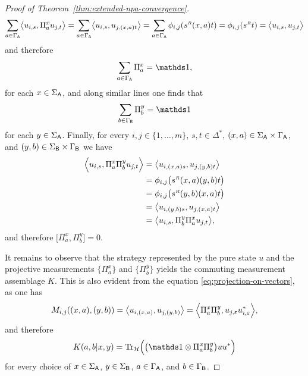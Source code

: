 \begin{proof}[Proof of Theorem~\ref{thm:extended-npa-convergence}]
  \begin{equation}
    \sum_{a\in \GammaA} \bigip{u_{i,s}}{\Pi^x_a u_{j,t}}
    = \sum_{a\in \GammaA} \bigip{u_{i,s}}{u_{j,(x,a)t}}
    = \sum_{a\in \GammaA} \phi_{i,j}(s^{\mathsmaller{R}}(x,a)t)
    = \phi_{i,j}(s^{\mathsmaller{R}}t) = \bigip{u_{i,s}}{u_{j,t}}
  \end{equation}
  and therefore
  \begin{equation}
    \sum_{a\in \GammaA}\Pi^x_a = \I, 
  \end{equation}
  for each $x\in \Sigma_{\mathsf{A}}$, and along similar lines one finds that
  \begin{equation}
    \sum_{b\in \GammaB}\Pi^y_b = \I
  \end{equation}
  for each $y\in \Sigma_{\mathsf{A}}$.
  Finally, for every $i,j\in\{1,\ldots,m\}$, $s,t\in\Delta^{\ast}$, 
  $(x,a)\in\Sigma_{\mathsf{A}} \times \Gamma_{\mathsf{A}}$, and $(y,b)\in\Sigma_{\mathsf{B}} \times \Gamma_{\mathsf{B}}$ we have
  \begin{equation}
    \begin{aligned}
      \Bigip{u_{i,s}}{\Pi^x_a \Pi^y_b u_{j,t}} &= \bigip{u_{i,(x,a)s}}{u_{j,(y,b)t}} \\
      &= \phi_{i,j}\bigl(s^{\mathsmaller{R}}(x,a)(y,b)t\bigr)\\
      &= \phi_{i,j}\bigl(s^{\mathsmaller{R}}(y,b)(x,a)t\bigr)\\
      &= \bigip{u_{i,(y,b)s}}{u_{j,(x,a)t}} \\
      &= \bigip{u_{i,s}}{\Pi^y_b \Pi^x_a u_{j,t}},
    \end{aligned}
  \end{equation}
  and therefore $\bigl[\Pi^x_a,\Pi^y_b\bigr] = 0$.

  It remains to observe that the strategy represented by the pure state
  $u$ and the projective measurements $\{\Pi^x_a\}$ and $\{\Pi^y_b\}$
  yields the commuting measurement assemblage $K$.
  This is also evident from the equation \eqref{eq:projection-on-vectors}, as
  one has
  \begin{equation}
    M_{i,j}((x,a),(y,b)) =
    \bigl\langle u_{i,(x,a)}, u_{j,(y,b)} \bigr\rangle =
    \Bigl\langle \Pi^x_a \Pi^y_b, u_{j,\varepsilon} u_{i,\varepsilon}^{\ast} \Bigr\rangle,
  \end{equation}
  and therefore
  \begin{equation}
    K(a,b|x,y) = \tr_{\H} \Bigl( \bigl(\I\otimes \Pi^x_a \Pi^y_b\bigr) u
    u^{\ast}\Bigr)
  \end{equation}
  for every choice of $x\in \Sigma_{\mathsf{A}}$, $y\in \Sigma_{\mathsf{B}}$, $a\in \Gamma_{\mathsf{A}}$, and $b\in \Gamma_{\mathsf{B}}$.
\end{proof}



